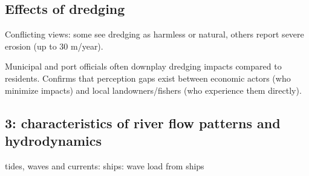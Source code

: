 \subsection{Effects of dredging}
Conflicting views: some see dredging as harmless or natural, others report severe erosion (up to 30 m/year).

Municipal and port officials often downplay dredging impacts compared to residents.
Confirms that perception gaps exist between economic actors (who minimize impacts) and local landowners/fishers (who experience them directly).

\subsection{3: characteristics of river flow patterns and hydrodynamics}
tides, waves and currents: 
ships: wave load from ships



